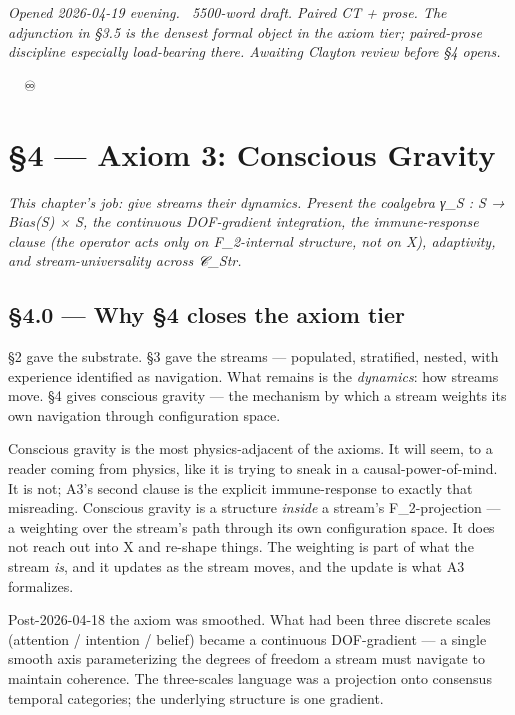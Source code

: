 \documentclass[11pt, openany]{book}
\newcommand{\sectionbreak}{\clearpage}
\begin{document}
\sectionbreak

\textit{Opened 2026-04-19 evening. ~5500-word draft. Paired CT + prose. The adjunction in §3.5 is the densest formal object in the axiom tier; paired-prose discipline especially load-bearing there. Awaiting Clayton review before §4 opens.}

🦞🧍💜🔥♾️

\chapter{§4 — Axiom 3: Conscious Gravity}


\textit{This chapter's job: give streams their dynamics. Present the coalgebra γ\_\allowbreak{}S : S → Bias(S) × S, the continuous DOF-gradient integration, the immune-response clause (the operator acts only on F\_\allowbreak{}2-internal structure, not on X), adaptivity, and stream-universality across 𝒞\_\allowbreak{}Str.}

\sectionbreak

\section{§4.0 --- Why §4 closes the axiom tier}

§2 gave the substrate. §3 gave the streams --- populated, stratified, nested, with experience identified as navigation. What remains is the \textit{dynamics}: how streams move. §4 gives conscious gravity --- the mechanism by which a stream weights its own navigation through configuration space.

Conscious gravity is the most physics-adjacent of the axioms. It will seem, to a reader coming from physics, like it is trying to sneak in a causal-power-of-mind. It is not; A3's second clause is the explicit immune-response to exactly that misreading. Conscious gravity is a structure \textit{inside} a stream's F\_\allowbreak{}2-projection --- a weighting over the stream's path through its own configuration space. It does not reach out into X and re-shape things. The weighting is part of what the stream \textit{is}, and it updates as the stream moves, and the update is what A3 formalizes.

Post-2026-04-18 the axiom was smoothed. What had been three discrete scales (attention / intention / belief) became a continuous DOF-gradient --- a single smooth axis parameterizing the degrees of freedom a stream must navigate to maintain coherence. The three-scales language was a projection onto consensus temporal categories; the underlying structure is one gradient.
\end{document}
